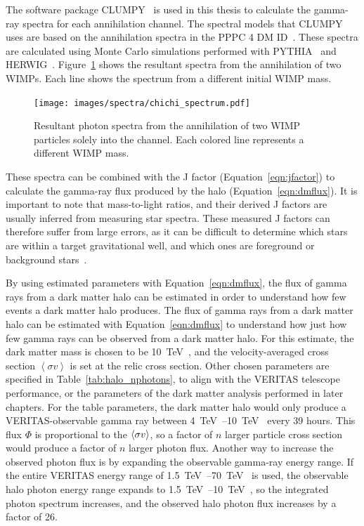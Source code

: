     The software package CLUMPY~\cite{CLUMPYcode} is used in this thesis to calculate the gamma-ray spectra for each annihilation channel.
    The spectral models that CLUMPY uses are based on the annihilation spectra in the PPPC 4 DM ID~\cite{pppc4_dm_spectra,pppc4_ewcorrections}.
    These spectra are calculated using Monte Carlo simulations performed with PYTHIA~\cite{pythia} and HERWIG~\cite{herwig}.
    Figure~\ref{fig:chichi_spectrum} shows the resultant spectra from the annihilation of two WIMPs.
    Each line shows the spectrum from a different initial WIMP mass.

    \begin{figure}[bt]
      \centering
      \texttt{[image: images/spectra/chichi\_spectrum.pdf]}
      \caption[Single Annihilation Spectra]{
        Resultant photon spectra from the annihilation of two WIMP particles solely into the \bbbar channel.
        Each colored line represents a different WIMP mass.
      }
      \label{fig:chichi_spectrum}
    \end{figure}

    These spectra can be combined with the J factor (Equation~\ref{eqn:jfactor}) to calculate the gamma-ray flux produced by the halo (Equation~\ref{eqn:dmflux}).
    It is important to note that mass-to-light ratios, and their derived J factors are usually inferred from measuring star spectra.
    These measured J factors can therefore suffer from large errors, as it can be difficult to determine which stars are within a target gravitational well, and which ones are foreground or background stars~\cite{segue_jfactor_errors}.
    
    By using estimated parameters with Equation~\ref{eqn:dmflux}, the flux of gamma rays from a dark matter halo can be estimated in order to understand how few events a dark matter halo produces.
    The flux of gamma rays from a dark matter halo can be estimated with Equation~\ref{eqn:dmflux} to understand how just how few gamma rays can be observed from a dark matter halo.
    For this estimate, the dark matter mass is chosen to be \SI{10}{\TeV{}}, and the velocity-averaged cross section $\left < \sigma v \right >$ is set at the relic cross section.
    Other chosen parameters are specified in Table~\ref{tab:halo_nphotons}, to align with the VERITAS telescope performance, or the parameters of the dark matter analysis performed in later chapters.
    For the table parameters, the dark matter halo would only produce a VERITAS-observable gamma ray between \SIrange{4}{10}{\TeV{}} every 39 hours.
    This flux $\Phi$ is proportional to the $\left < \sigma v \right >$, so a factor of $n$ larger particle cross section would produce a factor of $n$ larger photon flux.
    Another way to increase the observed photon flux is by expanding the observable gamma-ray energy range.
    If the entire VERITAS energy range of \SIrange{1.5}{70}{\TeV{}} is used, the observable halo photon energy range expands to \SIrange{1.5}{10}{\TeV{}}, so the integrated photon spectrum increases, and the observed halo photon flux increases by a factor of 26.
    
